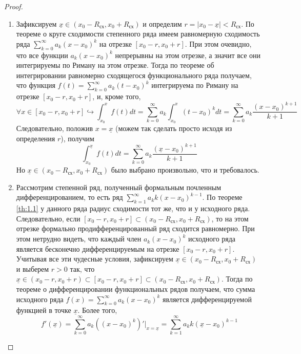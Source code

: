 \documentclass[11pt]{article}
\begin{document}
\begin{proof}
    \begin{enumerate}
        \item Зафиксируем $\underline{x} \in \left(x_0 - R_{\text{сх}}, x_0 + R_{\text{сх}}\right)$ и определим $r = \left\lvert x_0 - \underline{x} \right\rvert < R_{\text{сх}}$. По теореме о круге сходимости степенного ряда имеем равномерную сходимость ряда $\displaystyle \sum_{k = 0}^{\infty} a_k (x - x_0)^{k}$ на отрезке $[x_0 - r, x_0 + r]$. При этом очевидно, что все функции $a_k (x - x_0)^k$ непрерывны на этом отрезке, а значит все они интегрируемы по Риману на этом отрезке. Тогда по теореме об интегрировании равномерно сходящегося функционального ряда получаем, что функция $\displaystyle f(t) = \sum_{k = 0}^{\infty} a_k (t - x_0)^k$ интегрируема по Риману на отрезке $[x_0 - r, x_0 + r]$, и, кроме того, 
        \[\forall x \in [x_0 - r, x_0 + r] \hookrightarrow \int_{x_0}^{x} f(t) dt = \sum_{k = 0}^{\infty} a_k \int_{x_0}^{x} (t - x_0)^k dt = \sum_{k = 0}^{\infty} a_k \frac{(x - x_0)^{k + 1}}{k + 1}\]
        Следовательно, положив $x = \underline{x}$ (можем так сделать просто исходя из определения $r$), получим
        \[\int_{x_0}^{\underline{x}} f(t) dt = \sum_{k = 0}^{\infty} a_k \frac{(\underline{x} - x_0)^{k + 1}}{k + 1}\]
        Но $\underline{x} \in \left(x_0 - R_{\text{сх}}, x_0 + R_{\text{сх}}\right)$ было выбрано произвольно, что и требовалось.
        \item Рассмотрим степенной ряд, полученный формальным почленным дифференцированием, то есть ряд $\displaystyle \sum_{k = 1}^{\infty} a_k k (x - x_0)^{k - 1}$. По теореме \ref{th:1.1} у данного ряда радиус сходимости тот же, что и у исходного ряда. Следовательно, если $[x_0 - r, x_0 + r] \subset (x_0 - R_{\text{сх}}, x_0 + R_{\text{сх}})$, то на этом отрезке формально продифференцированный ряд сходится равномерно. При этом нетрудно видеть, что каждый член $a_k (x - x_0)^k$ исходного ряда является бесконечно дифференцируемым на отрезке $[x_0 - r, x_0 + r]$. Учитывая все эти чудесные условия, зафиксируем $\underline{x} \in \left(x_0 - R_{\text{сх}}, x_0 + R_{\text{сх}}\right)$ и выберем $r > 0$ так, что $\underline{x} \in (x_0 - r, x_0 + r) \subset [x_0 - r, x_0 + r] \subset (x_0 - R_{\text{сх}}, x_0 + R_{\text{сх}})$. Тогда по теореме о дифференцировании функциональных рядов получаем, что сумма исходного ряда $\displaystyle f(x) = \sum_{k = 0}^{\infty} a_k (x - x_0)^k$ является дифференцируемой функцией в точке $\underline{x}$. Более того,
        \[f'(\underline{x}) = \sum_{k = 0}^{\infty} a_k \left((x - x_0)^k\right)' \Biggr|_{x = \underline{x}} = \sum_{k = 1}^{\infty} a_k k (\underline{x} - x_0)^{k - 1}\]

\end{enumerate}
\end{proof}
\end{document}
